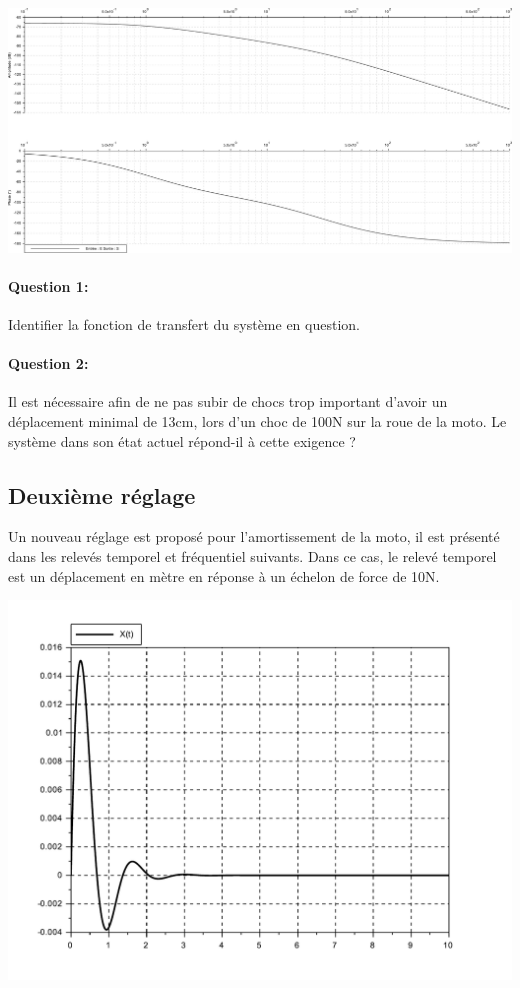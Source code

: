 \begin{center}
 \includegraphics[width=0.9\linewidth]{img/02b}
\end{center}

\paragraph{Question 1:} Identifier la fonction de transfert du système en question.

\paragraph{Question 2:} Il est nécessaire afin de ne pas subir de chocs trop important d'avoir un déplacement minimal de 13cm, lors d'un choc de 100N sur la roue de la moto. Le système dans son état actuel répond-il à cette exigence ?

\subsection{Deuxième réglage}

Un nouveau réglage est proposé pour l'amortissement de la moto, il est présenté dans les relevés temporel et fréquentiel suivants. Dans ce cas, le relevé temporel est un déplacement en mètre en réponse à un échelon de force de 10N.

\begin{center}
 \includegraphics[width=0.6\linewidth]{img/03}
\end{center}

